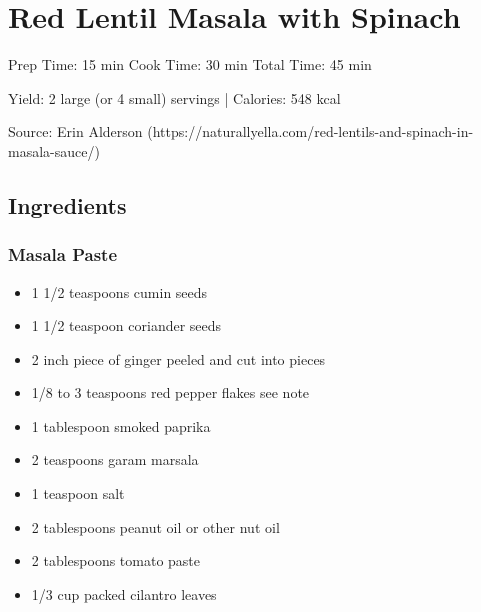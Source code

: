\section{Red Lentil Masala with Spinach}

\begin{center}
Prep Time: 15 min
Cook Time: 30 min
Total Time: 45 min

\noindent Yield: 2 large (or 4 small) servings | Calories: 548 kcal

\vspace{1em}

  Source: Erin Alderson (https://naturallyella.com/red-lentils-and-spinach-in-masala-sauce/)
\end{center}

\subsection{Ingredients}
\subsubsection{Masala Paste}
\begin{multicols}{2}
\begin{itemize}
  \item 1 1/2   teaspoons cumin seeds
  \item 1 1/2   teaspoon coriander seeds
  \item 2   inch piece of ginger peeled and cut into pieces
  \item 1/8 to 3 teaspoons red pepper flakes see note
  \item 1   tablespoon smoked paprika
  \item 2   teaspoons garam marsala
  \item 1   teaspoon salt
  \item 2   tablespoons peanut oil or other nut oil
  \item 2   tablespoons tomato paste
  \item 1/3 cup packed cilantro leaves
\end{itemize}
\end{multicols}

